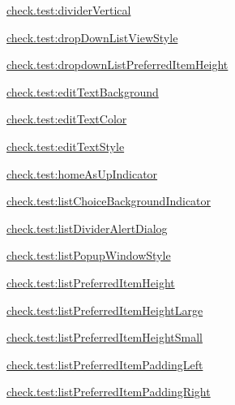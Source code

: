{\ttfamily \hyperlink{classcheck_1_1test_1_1_r_1_1styleable_a377c24517d2d2e1fec3897b381126055}{check.\+test\+:divider\+Vertical}}

{\ttfamily \hyperlink{classcheck_1_1test_1_1_r_1_1styleable_ab53b97b9568cde83dc65605a14dab2f4}{check.\+test\+:drop\+Down\+List\+View\+Style}}

{\ttfamily \hyperlink{classcheck_1_1test_1_1_r_1_1styleable_a4b8e66fe596de4f95de89a3fb97316d8}{check.\+test\+:dropdown\+List\+Preferred\+Item\+Height}}

{\ttfamily \hyperlink{classcheck_1_1test_1_1_r_1_1styleable_ab28653ef2c423653f679a95b9eb7e7fa}{check.\+test\+:edit\+Text\+Background}}

{\ttfamily \hyperlink{classcheck_1_1test_1_1_r_1_1styleable_ab8022b2bf8b784e17530f17a05186fa2}{check.\+test\+:edit\+Text\+Color}}

{\ttfamily \hyperlink{classcheck_1_1test_1_1_r_1_1styleable_ac901bbf20d4b5142cbf9b03381ae438b}{check.\+test\+:edit\+Text\+Style}}

{\ttfamily \hyperlink{classcheck_1_1test_1_1_r_1_1styleable_aae9299f409cd1528cb1b807fe0eecbb0}{check.\+test\+:home\+As\+Up\+Indicator}}

{\ttfamily \hyperlink{classcheck_1_1test_1_1_r_1_1styleable_a26daf114808db4e2394c40f88131eb51}{check.\+test\+:list\+Choice\+Background\+Indicator}}

{\ttfamily \hyperlink{classcheck_1_1test_1_1_r_1_1styleable_ab74d6b5271031da6a2f14e60706211e7}{check.\+test\+:list\+Divider\+Alert\+Dialog}}

{\ttfamily \hyperlink{classcheck_1_1test_1_1_r_1_1styleable_a43cec80892caa72b4d7185ffbe3950f9}{check.\+test\+:list\+Popup\+Window\+Style}}

{\ttfamily \hyperlink{classcheck_1_1test_1_1_r_1_1styleable_ab8d78a772c83aad6fa1b020d5f846f67}{check.\+test\+:list\+Preferred\+Item\+Height}}

{\ttfamily \hyperlink{classcheck_1_1test_1_1_r_1_1styleable_a6b792de713c77b5d2897ffd143ea5d6a}{check.\+test\+:list\+Preferred\+Item\+Height\+Large}}

{\ttfamily \hyperlink{classcheck_1_1test_1_1_r_1_1styleable_a59adeb7f43ab4c55c41858885f6d3085}{check.\+test\+:list\+Preferred\+Item\+Height\+Small}}

{\ttfamily \hyperlink{classcheck_1_1test_1_1_r_1_1styleable_ae246fdddad967741c0a3101714a40ef3}{check.\+test\+:list\+Preferred\+Item\+Padding\+Left}}

{\ttfamily \hyperlink{classcheck_1_1test_1_1_r_1_1styleable_a784a9d6670f4b87a95a04b867b4b4e7b}{check.\+test\+:list\+Preferred\+Item\+Padding\+Right}}

